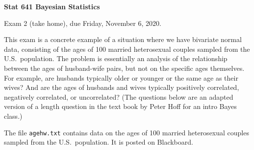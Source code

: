 \documentclass[12pt]{article}
\begin{document}
\setcounter{page}{1}
\thispagestyle{empty}


\begin{center}
{\bf Stat 641 Bayesian Statistics}

Exam 2 (take home), due Friday, November 6, 2020.
\end{center}

\noindent
This exam is a concrete example of a situation where we have bivariate
normal data, consisting of the ages of 100 married heterosexual couples
sampled from the U.S.\ population.
The problem is essentially an analysis of the relationship between the ages
of husband-wife pairs, but not on the specific ages themselves.
For example, are husbands typically older or younger or
the same age as their wives? And are the ages of husbands and wives typically
positively correlated, negatively correlated, or uncorrelated?
(The questions below are an adapted version of a length question
in the text book by Peter Hoff for an intro Bayes class.)

\vspace{.2in}\noindent
The file \verb+agehw.txt+ contains data on the ages of 100 married
heterosexual couples sampled from the U.S.\ population. It is posted
on Blackboard.
\end{document}
